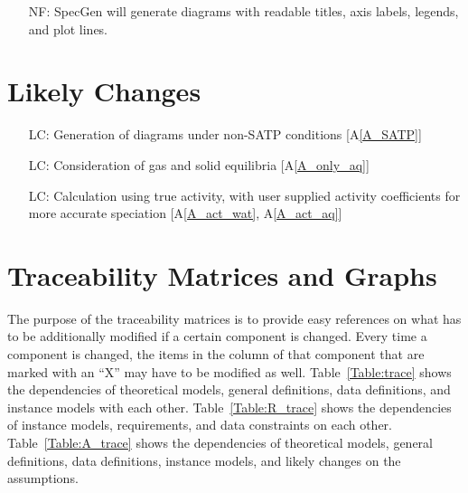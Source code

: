 \documentclass[12pt]{article}
\newcommand{\aref}[1]{A\ref{#1}}
\newcounter{reqnum} %
\newcounter{nfreqnum} %
\newcounter{lcnum} %
\newcommand{\progname}{SpecGen} %
\begin{document}
\begin{itemize}
\item[NF\refstepcounter{nfreqnum}\thenfreqnum \label{NF_Diag}:] \progname{} will
  generate diagrams with readable titles, axis labels, legends, and plot lines.
\end{itemize}

\section{Likely Changes}    

\noindent \begin{itemize}

\item[LC\refstepcounter{lcnum}\thelcnum\label{LC_SATP}:] Generation of diagrams 
  under non-SATP conditions [\aref{A_SATP}]
\item[LC\refstepcounter{lcnum}\thelcnum\label{LC_state}:] Consideration of gas 
  and solid equilibria [\aref{A_only_aq}]
\item[LC\refstepcounter{lcnum}\thelcnum\label{LC_act}:] Calculation using true 
  activity, with user supplied activity coefficients for more accurate 
  speciation [\aref{A_act_wat}, \aref{A_act_aq}] 

\end{itemize}


\section{Traceability Matrices and Graphs}

The purpose of the traceability matrices is to provide easy references on what
has to be additionally modified if a certain component is changed.  Every time a
component is changed, the items in the column of that component that are marked
with an ``X'' may have to be modified as well.  Table~\ref{Table:trace} shows 
the dependencies of theoretical models, general definitions, data definitions, 
and instance models with each other. Table~\ref{Table:R_trace} shows the
dependencies of instance models, requirements, and data constraints on each
other. Table~\ref{Table:A_trace} shows the dependencies of theoretical models,
general definitions, data definitions, instance models, and likely changes on
the assumptions.
\end{document}

